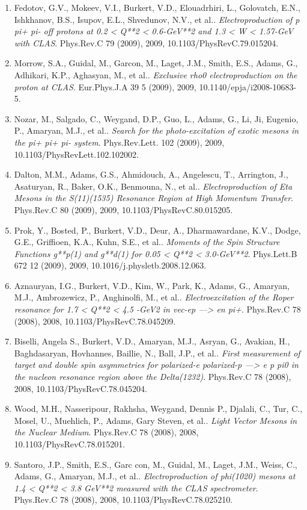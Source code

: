 \begin{enumerate}
\item Fedotov, G.V., Mokeev, V.I., Burkert, V.D., Elouadrhiri, L., Golovatch, E.N., Ishkhanov, B.S., Isupov, E.L., Shvedunov, N.V., et al.. \textit{Electroproduction of p pi+ pi- off protons at 0.2 < Q**2 < 0.6-GeV**2 and 1.3 < W < 1.57-GeV with CLAS}. Phys.Rev.C 79 (2009), 2009, 10.1103/PhysRevC.79.015204.
\item Morrow, S.A., Guidal, M., Garcon, M., Laget, J.M., Smith, E.S., Adams, G., Adhikari, K.P., Aghasyan, M., et al.. \textit{Exclusive rho0 electroproduction on the proton at CLAS}. Eur.Phys.J.A 39 5 (2009), 2009, 10.1140/epja/i2008-10683-5.
\item Nozar, M., Salgado, C., Weygand, D.P., Guo, L., Adams, G., Li, Ji, Eugenio, P., Amaryan, M.J., et al.. \textit{Search for the photo-excitation of exotic mesons in the pi+ pi+ pi- system}. Phys.Rev.Lett. 102 (2009), 2009, 10.1103/PhysRevLett.102.102002.
\item Dalton, M.M., Adams, G.S., Ahmidouch, A., Angelescu, T., Arrington, J., Asaturyan, R., Baker, O.K., Benmouna, N., et al.. \textit{Electroproduction of Eta Mesons in the S(11)(1535) Resonance Region at High Momentum Transfer}. Phys.Rev.C 80 (2009), 2009, 10.1103/PhysRevC.80.015205.
\item Prok, Y., Bosted, P., Burkert, V.D., Deur, A., Dharmawardane, K.V., Dodge, G.E., Griffioen, K.A., Kuhn, S.E., et al.. \textit{Moments of the Spin Structure Functions g**p(1) and g**d(1) for 0.05 < Q**2 < 3.0-GeV**2}. Phys.Lett.B 672 12 (2009), 2009, 10.1016/j.physletb.2008.12.063.
\item Aznauryan, I.G., Burkert, V.D., Kim, W., Park, K., Adams, G., Amaryan, M.J., Ambrozewicz, P., Anghinolfi, M., et al.. \textit{Electroexcitation of the Roper resonance for 1.7 < Q**2 < 4.5 -GeV2 in vec-ep ---> en pi+}. Phys.Rev.C 78 (2008), 2008, 10.1103/PhysRevC.78.045209.
\item Biselli, Angela S., Burkert, V.D., Amaryan, M.J., Asryan, G., Avakian, H., Baghdasaryan, Hovhannes, Baillie, N., Ball, J.P., et al.. \textit{First measurement of target and double spin asymmetries for polarized-e polarized-p ---> e p pi0 in the nucleon resonance region above the Delta(1232)}. Phys.Rev.C 78 (2008), 2008, 10.1103/PhysRevC.78.045204.
\item Wood, M.H., Nasseripour, Rakhsha, Weygand, Dennis P., Djalali, C., Tur, C., Mosel, U., Muehlich, P., Adams, Gary Steven, et al.. \textit{Light Vector Mesons in the Nuclear Medium}. Phys.Rev.C 78 (2008), 2008, 10.1103/PhysRevC.78.015201.
\item Santoro, J.P., Smith, E.S., Garc con, M., Guidal, M., Laget, J.M., Weiss, C., Adams, G., Amaryan, M.J., et al.. \textit{Electroproduction of phi(1020) mesons at 1.4 < Q**2 < 3.8 GeV**2 measured with the CLAS spectrometer}. Phys.Rev.C 78 (2008), 2008, 10.1103/PhysRevC.78.025210.

\end{enumerate}

